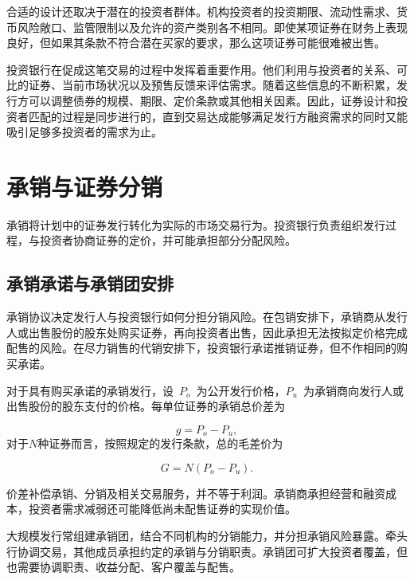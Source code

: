 合适的设计还取决于潜在的投资者群体。机构投资者的投资期限、流动性需求、货币风险敞口、监管限制以及允许的资产类别各不相同。即使某项证券在财务上表现良好，但如果其条款不符合潜在买家的要求，那么这项证券可能很难被出售。

投资银行在促成这笔交易的过程中发挥着重要作用。他们利用与投资者的关系、可比的证券、当前市场状况以及预售反馈来评估需求。随着这些信息的不断积累，发行方可以调整债券的规模、期限、定价条款或其他相关因素。因此，证券设计和投资者匹配的过程是同步进行的，直到交易达成能够满足发行方融资需求的同时又能吸引足够多投资者的需求为止。

\section{承销与证券分销}

承销将计划中的证券发行转化为实际的市场交易行为。投资银行负责组织发行过程，与投资者协商证券的定价，并可能承担部分分配风险。

\subsection{承销承诺与承销团安排}

承销协议决定发行人与投资银行如何分担分销风险。在包销安排下，承销商从发行人或出售股份的股东处购买证券，再向投资者出售，因此承担无法按拟定价格完成配售的风险。在尽力销售的代销安排下，投资银行承诺推销证券，但不作相同的购买承诺。

对于具有购买承诺的承销发行，设~$P_o$~为公开发行价格，$P_u$~为承销商向发行人或出售股份的股东支付的价格。每单位证券的承销总价差为

\begin{equation}
g=P_o-P_u,
\label{eq:ch13-underwriting-spread}
\end{equation}
对于$N$种证券而言，按照规定的发行条款，总的毛差价为

\begin{equation}
G=N(P_o-P_u).
\label{eq:ch13-total-underwriting-spread}
\end{equation}

价差补偿承销、分销及相关交易服务，并不等于利润。承销商承担经营和融资成本，投资者需求减弱还可能降低尚未配售证券的实现价值。

大规模发行常组建承销团，结合不同机构的分销能力，并分担承销风险暴露。牵头行协调交易，其他成员承担约定的承销与分销职责。承销团可扩大投资者覆盖，但也需要协调职责、收益分配、客户覆盖与配售。

